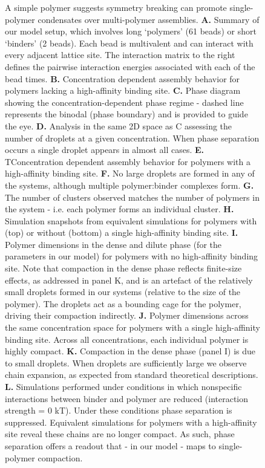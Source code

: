 \documentclass[../main.tex]{subfiles}
\begin{document}
\begin{figure}[!htb]
                {A simple polymer suggests symmetry breaking can promote single-polymer condensates over multi-polymer assemblies. \textbf{A.} Summary of our model setup, which involves long ‘polymers’ (61 beads) or short ‘binders’ (2 beads). Each bead is multivalent and can interact with every adjacent lattice site. The interaction matrix to the right defines the pairwise interaction energies associated with each of the bead times. \textbf{B.} Concentration dependent assembly behavior for polymers lacking a high-affinity binding site. \textbf{C.} Phase diagram showing the concentration-dependent phase regime - dashed line represents the binodal (phase boundary) and is provided to guide the eye. \textbf{D.} Analysis in the same 2D space as C assessing the number of droplets at a given concentration. When phase separation occurs a single droplet appears in almost all cases. \textbf{E.} TConcentration dependent assembly behavior for polymers with a high-affinity binding site. \textbf{F.} No large droplets are formed in any of the systems, although multiple polymer:binder complexes form. \textbf{G.} The number of clusters observed matches the number of polymers in the system - i.e. each polymer forms an individual cluster. \textbf{H.} Simulation snapshots from equivalent simulations for polymers with (top) or without (bottom) a single high-affinity binding site. \textbf{I.} Polymer dimensions in the dense and dilute phase (for the parameters in our model) for polymers with no high-affinity binding site. Note that compaction in the dense phase reflects finite-size effects, as addressed in panel K, and is an artefact of the relatively small droplets formed in our systems (relative to the size of the polymer). The droplets act as a bounding cage for the polymer, driving their compaction indirectly. \textbf{J.} Polymer dimensions across the same concentration space for polymers with a single high-affinity binding site. Across all concentrations, each individual polymer is highly compact. \textbf{K.} Compaction in the dense phase (panel I) is due to small droplets. When droplets are sufficiently large we observe chain expansion, as expected from standard theoretical descriptions. \textbf{L.} Simulations performed under conditions in which nonspecific interactions between binder and polymer are reduced (interaction strength = 0 kT). Under these conditions phase separation is suppressed. Equivalent simulations for polymers with a high-affinity site reveal these chains are no longer compact. As such, phase separation offers a readout that - in our model - maps to single-polymer compaction.}
            \label{fig:ch6-fig6}
        \end{figure}
\end{document}
